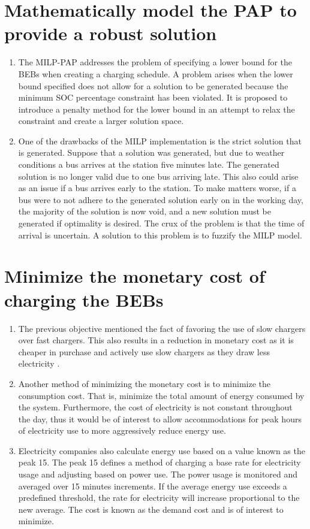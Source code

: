 \documentclass[ee,msthesis]{usuthesis}
\begin{document}
\section{Mathematically model the PAP to provide a robust solution}
\label{sec:obj-math-model-robust}
\begin{enumerate}
\item The MILP-PAP addresses the problem of specifying a lower bound for the BEBs when creating a charging schedule. A
problem arises when the lower bound specified does not allow for a solution to be generated because the minimum SOC
percentage constraint has been violated. It is proposed to introduce a penalty method for the lower bound in an
attempt to relax the constraint and create a larger solution space.

\item One of the drawbacks of the MILP implementation is the strict solution that is generated. Suppose that a solution was
generated, but due to weather conditions a bus arrives at the station five minutes late. The generated solution is no
longer valid due to one bus arriving late. This also could arise as an issue if a bus arrives early to the station.
To make matters worse, if a bus were to not adhere to the generated solution early on in the working day, the
majority of the solution is now void, and a new solution must be generated if optimality is desired. The crux of the
problem is that the time of arrival is uncertain. A solution to this problem is to fuzzify the MILP model.
\end{enumerate}

\section{Minimize the monetary cost of charging the BEBs}
\label{sec:org3754f0b}

\begin{enumerate}
\item The previous objective mentioned the fact of favoring the use of slow chargers over fast chargers. This also results
in a reduction in monetary cost as it is cheaper in purchase and actively use slow chargers as they draw less
electricity \cite{he-2020-optim-charg}.

\item Another method of minimizing the monetary cost is to minimize the consumption cost. That is, minimize the total
amount of energy consumed by the system. Furthermore, the cost of electricity is not constant throughout the day,
thus it would be of interest to allow accommodations for peak hours of electricity use to more aggressively reduce
energy use.

\item Electricity companies also calculate energy use based on a value known as the peak 15. The peak 15 defines a method
of charging a base rate for electricity usage and adjusting based on power use. The power usage is monitored and averaged
over 15 minutes increments. If the average energy use exceeds a predefined threshold, the rate for electricity will
increase proportional to the new average. The cost is known as the demand cost and is of interest to minimize.
\end{enumerate}
\end{document}
